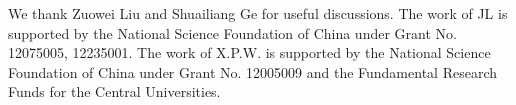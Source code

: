 \documentclass[prd,showpacs,preprintnumbers,amsmath,amssymb,twocolumn,superscriptaddress,notitlepage]{revtex4-2}
\begin{document}

\begin{acknowledgments}
We thank Zuowei Liu and Shuailiang Ge for useful discussions. 
The work of JL is supported by the National Science Foundation of China under Grant No. 12075005, 12235001. 
The work of X.P.W. is supported by the National Science Foundation of China under Grant No. 12005009 and the Fundamental Research Funds for the Central Universities.
\end{acknowledgments}


{}






\clearpage

	\setcounter{equation}{0}
	\setcounter{figure}{0}
	\setcounter{table}{0}
	\setcounter{section}{0}
	\makeatletter
	\renewcommand{\theequation}{S\arabic{equation}}
	\renewcommand{\thefigure}{S\arabic{figure}}
	\renewcommand{\thetable}{S\arabic{table}}
\end{document}

